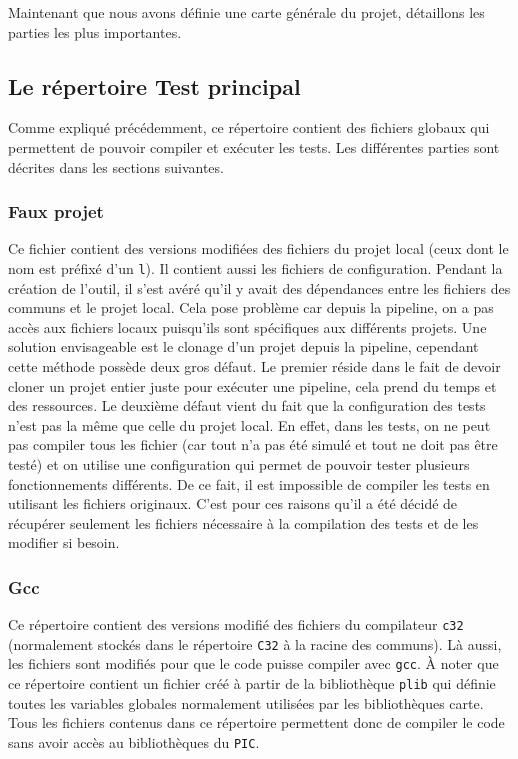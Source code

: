 \documentclass[a4paper]{article}
\begin{document}
Maintenant que nous avons définie une carte générale du projet, détaillons les
parties les plus importantes.

\subsection{Le répertoire Test principal}

Comme expliqué précédemment, ce répertoire contient des fichiers globaux
qui permettent de pouvoir compiler et exécuter les tests. Les différentes
parties sont décrites dans les sections suivantes.

\subsubsection*{Faux projet}
\label{fakeproj}

Ce fichier contient des versions modifiées des fichiers du projet local (ceux
dont le nom est préfixé d'un \verb|l|). Il contient aussi les fichiers de
configuration. Pendant la création de l'outil, il s'est avéré qu'il y avait des
dépendances entre les fichiers des communs et le projet local. Cela pose
problème car depuis la pipeline, on a pas accès aux fichiers locaux puisqu'ils
sont spécifiques aux différents projets. Une solution envisageable est le
clonage d'un projet depuis la pipeline, cependant cette méthode possède deux
gros défaut. Le premier réside dans le fait de devoir cloner un projet entier
juste pour exécuter une pipeline, cela prend du temps et des ressources. Le
deuxième défaut vient du fait que la configuration des tests n'est pas la même
que celle du projet local. En effet, dans les tests, on ne peut pas compiler
tous les fichier (car tout n'a pas été simulé et tout ne doit pas être testé) et
on utilise une configuration qui permet de pouvoir tester plusieurs
fonctionnements différents. De ce fait, il est impossible de compiler les tests
en utilisant les fichiers originaux. C'est pour ces raisons qu'il a été décidé
de récupérer seulement les fichiers nécessaire à la compilation des tests et de
les modifier si besoin.

\subsubsection*{Gcc}
\label{gcc}

Ce répertoire contient des versions modifié des fichiers du compilateur
\verb|c32| (normalement stockés dans le répertoire \verb|C32| à la racine des
communs). Là aussi, les fichiers sont modifiés pour que le code puisse compiler
avec \verb|gcc|. À noter que ce répertoire contient un fichier créé à partir de
la bibliothèque \verb|plib| qui définie toutes les variables globales
normalement utilisées par les bibliothèques carte. Tous les fichiers contenus
dans ce répertoire permettent donc de compiler le code sans avoir accès au
bibliothèques du \verb|PIC|.
\end{document}
